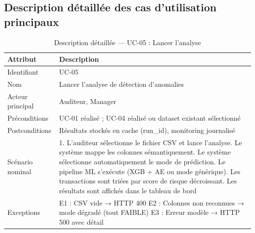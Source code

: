 \documentclass[12pt,a4paper,twoside]{report}
\theoremstyle{definition}
\begin{document}
\subsection{Description détaillée des cas d'utilisation principaux}

\begin{table}[H]
\centering
\caption{Description détaillée — UC-05 : Lancer l'analyse}
\label{tab:uc05}
\renewcommand{\arraystretch}{1.3}
\begin{tabular}{L{3.5cm}L{9.5cm}}
\toprule
\textbf{Attribut} & \textbf{Description} \\
\midrule
Identifiant & UC-05 \\
Nom & Lancer l'analyse de détection d'anomalies \\
Acteur principal & Auditeur, Manager \\
Préconditions & UC-01 réalisé ; UC-04 réalisé ou dataset existant sélectionné \\
Postconditions & Résultats stockés en cache (run\_id), monitoring journalisé \\
Scénario nominal &
1. L'auditeur sélectionne le fichier CSV et lance l'analyse. Le système mappe les colonnes sémantiquement. Le système sélectionne automatiquement le mode de prédiction. Le pipeline ML s'exécute (XGB + AE ou mode générique). Les transactions sont triées par score de risque décroissant. Les résultats sont affichés dans le tableau de bord \\
Exceptions &
E1 : CSV vide → HTTP 400\newline
E2 : Colonnes non reconnues → mode dégradé (tout FAIBLE)\newline
E3 : Erreur modèle → HTTP 500 avec détail \\
\bottomrule
\end{tabular}
\end{table}
\end{document}
